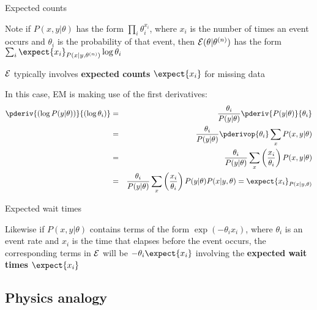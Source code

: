 \documentclass{beamer}
\begin{document}
\begin{frame}{Expected counts}

Note if $P(x,y|\theta)$ has the form $\prod_i \theta_i^{x_i}$,
where $x_i$ is the number of times an event occurs and $\theta_i$ is the probability of that event,
then ${\cal E}(\theta|\theta^{(n)})$ has the form $\sum_i \expect{x_i}_{P(x|y,\theta^{(n)})} \log \theta_i$

   \itemb
   \item ${\cal E}$ typically involves {\bf expected counts} $\expect{x_i}$ for missing data
\itemb
   \item In this case, EM is making use of the first derivatives:
\begin{eqnarray*}
\pderiv{(\log P(y|\theta))}{(\log \theta_i)} & = & \frac{\theta_i}{P(y|\theta)} \pderiv{P(y|\theta)}{\theta_i} \\
 & = & \frac{\theta_i}{P(y|\theta)} \pderivop{\theta_i} \sum_x P(x,y|\theta) \\
 & = & \frac{\theta_i}{P(y|\theta)} \sum_x \left( \frac{x_i}{\theta_i} \right) P(x,y|\theta) \\
 & = & \frac{\theta_i}{P(y|\theta)} \sum_x \left( \frac{x_i}{\theta_i} \right) P(y|\theta) P(x|y,\theta)
= \expect{x_i}_{P(x|y,\theta)}
\end{eqnarray*}
   \iteme
\iteme

\end{frame}

\begin{frame}{Expected wait times}

\itemb
  \item Likewise if $P(x,y|\theta)$ contains terms of the form $\exp(-\theta_i x_i)$, where $\theta_i$ is an event rate and $x_i$ is the time that elapses before the event occurs,
the corresponding terms in ${\cal E}$ will be $-\theta_i \expect{x_i}$ involving the {\bf expected wait times} $\expect{x_i}$
  \iteme

\end{frame}

\subsection{Physics analogy}
\end{document}
